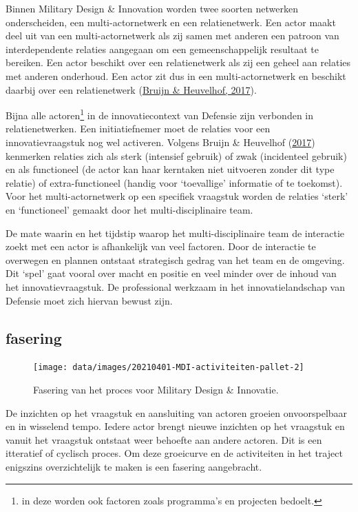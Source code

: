 \documentclass[
]{book}
\begin{document}
Binnen Military Design \& Innovation worden twee soorten netwerken onderscheiden, een multi-actornetwerk en een relatienetwerk. Een actor maakt deel uit van een multi-actornetwerk als zij samen met anderen een patroon van interdependente relaties aangegaan om een gemeenschappelijk resultaat te bereiken. Een actor beschikt over een relatienetwerk als zij een geheel aan relaties met anderen onderhoud. Een actor zit dus in een multi-actornetwerk en beschikt daarbij over een relatienetwerk (\protect\hyperlink{ref-bruijn2017management}{Bruijn \& Heuvelhof, 2017}).

Bijna alle actoren\footnote{in deze worden ook factoren zoals programma's en projecten bedoelt.} in de innovatiecontext van Defensie zijn verbonden in relatienetwerken. Een initiatiefnemer moet de relaties voor een innovatievraagstuk nog wel activeren. Volgens Bruijn \& Heuvelhof (\protect\hyperlink{ref-bruijn2017management}{2017}) kenmerken relaties zich als sterk (intensief gebruik) of zwak (incidenteel gebruik) en als functioneel (de actor kan haar kerntaken niet uitvoeren zonder dit type relatie) of extra-functioneel (handig voor `toevallige' informatie of te toekomst). Voor het multi-actornetwerk op een specifiek vraagstuk worden de relaties `sterk' en `functioneel' gemaakt door het multi-disciplinaire team.

De mate waarin en het tijdstip waarop het multi-disciplinaire team de interactie zoekt met een actor is afhankelijk van veel factoren. Door de interactie te overwegen en plannen ontstaat strategisch gedrag van het team en de omgeving. Dit `spel' gaat vooral over macht en positie en veel minder over de inhoud van het innovatievraagstuk. De professional werkzaam in het innovatielandschap van Defensie moet zich hiervan bewust zijn.

\hypertarget{fasering}{%
\subsection{fasering}\label{fasering}}

\begin{figure}

{\centering \texttt{[image: data/images/20210401-MDI-activiteiten-pallet-2]} 

}

\caption{Fasering van het proces voor Military Design \& Innovatie.}\label{fig:unnamed-chunk-11}
\end{figure}

De inzichten op het vraagstuk en aansluiting van actoren groeien onvoorspelbaar en in wisselend tempo. Iedere actor brengt nieuwe inzichten op het vraagstuk en vanuit het vraagstuk ontstaat weer behoefte aan andere actoren. Dit is een itteratief of cyclisch proces. Om deze groeicurve en de activiteiten in het traject enigszins overzichtelijk te maken is een fasering aangebracht.
\end{document}
